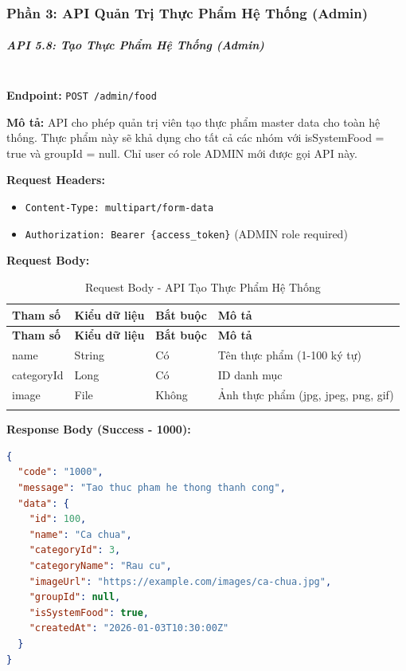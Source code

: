 \subsubsection{Phần 3: API Quản Trị Thực Phẩm Hệ Thống (Admin)}

\subparagraph{API 5.8: Tạo Thực Phẩm Hệ Thống (Admin)}~\\

\textbf{Endpoint:} \texttt{POST /admin/food}

\textbf{Mô tả:} API cho phép quản trị viên tạo thực phẩm master data cho toàn hệ thống. Thực phẩm này sẽ khả dụng cho tất cả các nhóm với isSystemFood = true và groupId = null. Chỉ user có role ADMIN mới được gọi API này.

\textbf{Request Headers:}
\begin{itemize}
    \item \texttt{Content-Type: multipart/form-data}
    \item \texttt{Authorization: Bearer \{access\_token\}} (ADMIN role required)
\end{itemize}

\textbf{Request Body:}

\small
\begin{longtable}{|>{\raggedright\arraybackslash}p{3.5cm}|>{\raggedright\arraybackslash}p{2.5cm}|>{\raggedright\arraybackslash}p{2cm}|>{\raggedright\arraybackslash}p{5.5cm}|}
\hline
\textbf{Tham số} & \textbf{Kiểu dữ liệu} & \textbf{Bắt buộc} & \textbf{Mô tả} \\
\hline
\endfirsthead
\hline
\textbf{Tham số} & \textbf{Kiểu dữ liệu} & \textbf{Bắt buộc} & \textbf{Mô tả} \\
\hline
\endhead
name & String & Có & Tên thực phẩm (1-100 ký tự) \\
\hline
categoryId & Long & Có & ID danh mục \\
\hline
image & File & Không & Ảnh thực phẩm (jpg, jpeg, png, gif) \\
\hline
\caption{Request Body - API Tạo Thực Phẩm Hệ Thống}
\end{longtable}

\textbf{Response Body (Success - 1000):}

\begin{lstlisting}[language=json, caption=Response thanh cong API 5.8]
{
  "code": "1000",
  "message": "Tao thuc pham he thong thanh cong",
  "data": {
    "id": 100,
    "name": "Ca chua",
    "categoryId": 3,
    "categoryName": "Rau cu",
    "imageUrl": "https://example.com/images/ca-chua.jpg",
    "groupId": null,
    "isSystemFood": true,
    "createdAt": "2026-01-03T10:30:00Z"
  }
}
\end{lstlisting}

